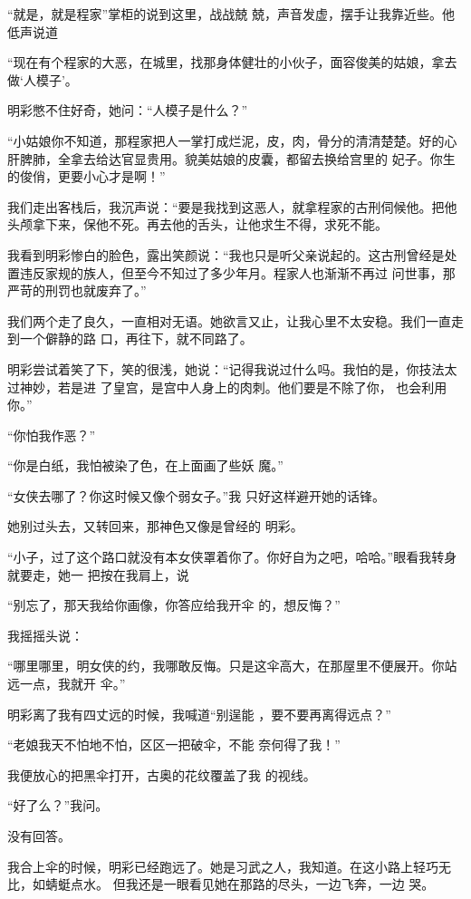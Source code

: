 \documentclass{article}
\begin{document}
“就是，就是程家”掌柜的说到这里，战战兢
兢，声音发虚，摆手让我靠近些。他低声说道 

“现在有个程家的大恶，在城里，找那身体健壮的小伙子，面容俊美的姑娘，拿去做‘人模子’。

明彩憋不住好奇，她问：“人模子是什么？”
\newpage


“小姑娘你不知道，那程家把人一掌打成烂泥，皮，肉，骨分的清清楚楚。好的心肝脾肺，全拿去给达官显贵用。貌美姑娘的皮囊，都留去换给宫里的
妃子。你生的俊俏，更要小心才是啊！” 

我们走出客栈后，我沉声说：“要是我找到这恶人，就拿程家的古刑伺候他。把他头颅拿下来，保他不死。再去他的舌头，让他求生不得，求死不能。

我看到明彩惨白的脸色，露出笑颜说：“我也只是听父亲说起的。这古刑曾经是处置违反家规的族人，但至今不知过了多少年月。程家人也渐渐不再过
问世事，那严苛的刑罚也就废弃了。” 

我们两个走了良久，一直相对无语。她欲言又止，让我心里不太安稳。我们一直走到一个僻静的路
口，再往下，就不同路了。 

明彩尝试着笑了下，笑的很浅，她说：“记得我说过什么吗。我怕的是，你技法太过神妙，若是进
\newpage
了皇宫，是宫中人身上的肉刺。他们要是不除了你，
也会利用你。” 


“你怕我作恶？” 

“你是白纸，我怕被染了色，在上面画了些妖
魔。” 

“女侠去哪了？你这时候又像个弱女子。”我
只好这样避开她的话锋。 

她别过头去，又转回来，那神色又像是曾经的
明彩。 

“小子，过了这个路口就没有本女侠罩着你了。你好自为之吧，哈哈。”眼看我转身就要走，她一
把按在我肩上，说 

“别忘了，那天我给你画像，你答应给我开伞
的，想反悔？” 

\newpage


我摇摇头说： 

“哪里哪里，明女侠的约，我哪敢反悔。只是这伞高大，在那屋里不便展开。你站远一点，我就开
伞。” 

明彩离了我有四丈远的时候，我喊道“别逞能
，要不要再离得远点？” 

“老娘我天不怕地不怕，区区一把破伞，不能
奈何得了我！” 

我便放心的把黑伞打开，古奥的花纹覆盖了我
的视线。 


“好了么？”我问。 


没有回答。 

我合上伞的时候，明彩已经跑远了。她是习武之人，我知道。在这小路上轻巧无比，如蜻蜓点水。
\newpage
但我还是一眼看见她在那路的尽头，一边飞奔，一边
哭。 
\end{document}
